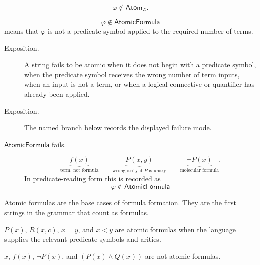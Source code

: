 \begin{remark*}
\[
\varphi\notin\mathsf{Atom}_{\mathcal L}.
\]
\end{remark*}

\begin{remark*}
\[
  \varphi\notin\mathsf{AtomicFormula}
\] means that \(\varphi\) is not a
predicate symbol applied to the required number of terms.
\end{remark*}

\begin{remark*}
\begin{description}
  \item[Exposition.] A string fails to be atomic when it does not begin with a predicate symbol,
when the predicate symbol receives the wrong number of term inputs, when an
input is not a term, or when a logical connective or quantifier has already
been applied.
\end{description}
\end{remark*}

\begin{remark*}
\begin{description}
  \item[Exposition.] The named branch below records the displayed failure mode.
\item[\(\mathsf{AtomicFormula}\) fails.] \[
\underbrace{f(x)}_{\text{term, not formula}}
\qquad
\underbrace{P(x,y)}_{\text{wrong arity if }P\text{ is unary}}
\qquad
\underbrace{\neg P(x)}_{\text{molecular formula}}.
\]
  In predicate-reading form this is recorded as
  \[
    \varphi\notin\mathsf{AtomicFormula}
  \]
\end{description}
\end{remark*}

\begin{remark*}[Interpretation]
Atomic formulas are the base cases of formula formation. They are the first
strings in the grammar that count as formulas.
\end{remark*}

\begin{remark*}[Examples]
\(P(x)\), \(R(x,c)\), \(x=y\), and \(x<y\) are atomic formulas when the
language supplies the relevant predicate symbols and arities.
\end{remark*}

\begin{remark*}
\(x\), \(f(x)\), \(\neg P(x)\), and \((P(x)\land Q(x))\) are not atomic
formulas.
\end{remark*}

